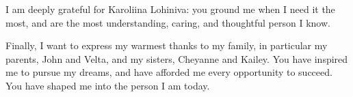 I am deeply grateful for Karoliina Lohiniva: you ground me when I need it the most, and are the most understanding, caring, and thoughtful person I know.  

Finally, I want to express my warmest thanks to my family, in particular my parents, John and Velta, and my sisters, Cheyanne and Kailey. You have inspired me to pursue my dreams, and have afforded me every opportunity to succeed. You have shaped me into the person I am today. 


